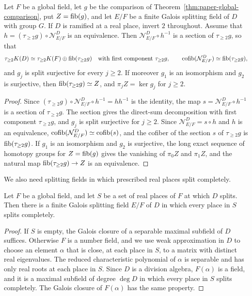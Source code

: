 \begin{lemma}\label{lem:paper-split-from-norm}
Let $F$ be a global field, let $g$ be the comparison of Theorem~\ref{thm:paper-global-comparison}, put $Z=\operatorname{fib}(g)$, and let $E/F$ be a finite Galois splitting field of $D$ with group $G$.
If $D$ is ramified at a real place, invert $2$ throughout.
Assume that $h=(\tau_{\ge2}g)\circ\mathcal N^{D}_{E/F}$ is an equivalence.
Then $\mathcal N^{D}_{E/F}\circ h^{-1}$ is a section of $\tau_{\ge2}g$, so that
\[
 \tau_{\ge2}K(D)\simeq\tau_{\ge2}K(F)\oplus\operatorname{fib}(\tau_{\ge2}g)
 \quad\text{with first component }\tau_{\ge2}g,
 \qquad
 \operatorname{cofib}(\mathcal N^{D}_{E/F})\simeq\operatorname{fib}(\tau_{\ge2}g),
\]
and $g_j$ is split surjective for every $j\ge2$.
If moreover $g_1$ is an isomorphism and $g_2$ is surjective, then $\operatorname{fib}(\tau_{\ge2}g)\simeq Z$, and $\pi_jZ=\ker g_j$ for $j\ge2$.
\end{lemma}
\begin{proof}
Since $(\tau_{\ge2}g)\circ\mathcal N^{D}_{E/F}\circ h^{-1}=hh^{-1}$ is the identity, the map $s=\mathcal N^{D}_{E/F}\circ h^{-1}$ is a section of $\tau_{\ge2}g$.
The section gives the direct-sum decomposition with first component $\tau_{\ge2}g$, and $g_j$ is split surjective for $j\ge2$.
Since $\mathcal N^{D}_{E/F}=s\circ h$ and $h$ is an equivalence, $\operatorname{cofib}(\mathcal N^{D}_{E/F})\simeq\operatorname{cofib}(s)$, and the cofiber of the section $s$ of $\tau_{\ge2}g$ is $\operatorname{fib}(\tau_{\ge2}g)$.
If $g_1$ is an isomorphism and $g_2$ is surjective, the long exact sequence of homotopy groups for $Z=\operatorname{fib}(g)$ gives the vanishing of $\pi_0Z$ and $\pi_1Z$, and the natural map $\operatorname{fib}(\tau_{\ge2}g)\to Z$ is an equivalence.
\end{proof}

We also need splitting fields in which prescribed real places split completely.

\begin{lemma}\label{lem:paper-galois-splitting-real}
Let $F$ be a global field, and let $S$ be a set of real places of $F$ at which $D$ splits.
Then there is a finite Galois splitting field $E/F$ of $D$ in which every place in $S$ splits completely.
\end{lemma}
\begin{proof}
If $S$ is empty, the Galois closure of a separable maximal subfield of $D$ suffices.
Otherwise $F$ is a number field, and we use weak approximation in $D$ to choose an element $\alpha$ that is close, at each place in $S$, to a matrix with distinct real eigenvalues.
The reduced characteristic polynomial of $\alpha$ is separable and has only real roots at each place in $S$.
Since $D$ is a division algebra, $F(\alpha)$ is a field, and it is a maximal subfield of degree $\deg D$ in which every place in $S$ splits completely.
The Galois closure of $F(\alpha)$ has the same property.
\end{proof}

